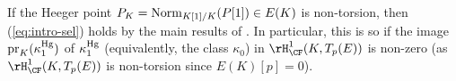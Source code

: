 \begin{remark}
\notready\label{rmk:hyp-sel}
If the Heeger point $P_K = {\rm Norm}_{K[1]/K}(P[1])\in E(K)$ is non-torsion, then
{\rm (\ref{eq:intro-sel})} holds by the main results of \cite{kolyvagin-mw-sha}.
In particular, this is so if the image ${\rm pr}_K(\kappa_1^{\rm Hg})$ of $\kappa_1^{\rm Hg}$
(equivalently, the class $\kappa_0$) in $\rH^1_{\CF}(K,T_p(E))$ is non-zero
(as $\rH^1_{\CF}(K,T_p(E))$ is non-torsion since $E(K)[p]= 0$).
\end{remark}
